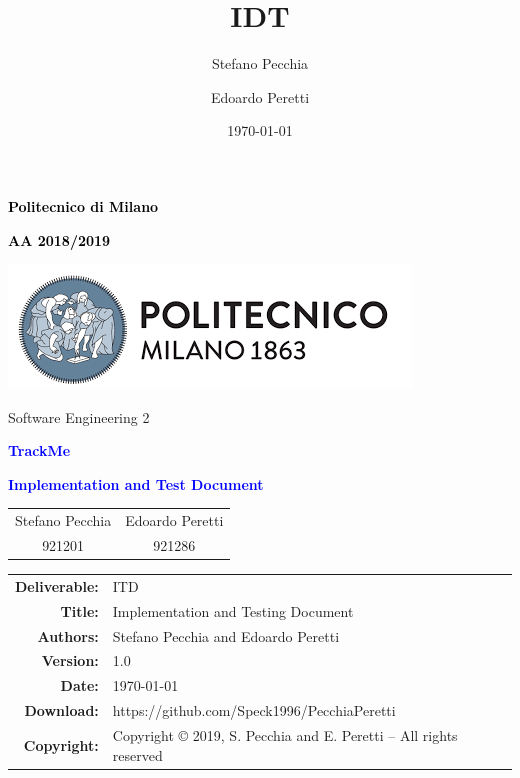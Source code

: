 \documentclass[11pt,a4paper]{article}
\title{IDT}
\author{Stefano Pecchia \and Edoardo Peretti}
\date{\today}
\begin{document}
\begin{titlepage}
\centering

\textcolor{black}{\textbf{Politecnico di Milano}} \par
\textcolor{black}{\textbf{AA 2018/2019}} \par  \vspace{2em}
\includegraphics[scale=0.7]{resources/PolimiLogo}\par \vspace{1em}

Software Engineering 2 \par \vspace{1.5cm}
\textcolor{Blue}{\Large\textbf{TrackMe}} \par \vspace{3cm}
 
{\textcolor{Blue}{\textbf{\Huge{Implementation and Test Document}}}} \vfill
\renewcommand\tabcolsep{4.5em}
\begin{tabular}{cc}
Stefano Pecchia & Edoardo Peretti   \\
921201  & 921286
\end{tabular}
\renewcommand\tabcolsep{6pt}

\vspace{4cm}
\end{titlepage}


\begin{table}[h!]
\centering
\begin{tabular}{rl}
\hline
\textbf{Deliverable:} & ITD\\
\textbf{Title:} & Implementation and Testing Document\\
\textbf{Authors:} & Stefano Pecchia and Edoardo Peretti\\
\textbf{Version:} & 1.0 \\ 
\textbf{Date:} & \today \\
\textbf{Download:} & https://github.com/Speck1996/PecchiaPeretti \\
\textbf{Copyright:} & Copyright © 2019, S. Pecchia and E. Peretti – All rights reserved \\
\hline
\end{tabular}
\end{table}

\newpage
\tableofcontents








\end{document}
